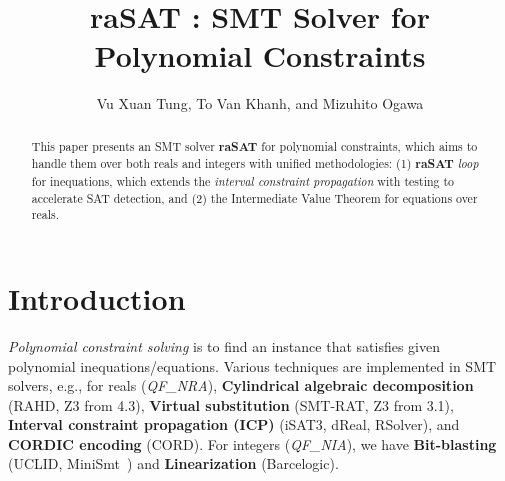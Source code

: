\documentclass[runningheads,a4paper,oribibl]{llncs}
\begin{document}
%

\title{raSAT : SMT Solver for Polynomial Constraints} 
\author{Vu Xuan Tung, To Van Khanh, and Mizuhito Ogawa} 


\maketitle

\begin{abstract}
  This paper presents an SMT solver {\bf raSAT} for polynomial constraints, 
  which aims to handle them over both reals and integers with
  unified methodologies: (1) {\bf raSAT} {\em loop} for inequations,
  which extends the \emph{interval constraint propagation}
  with testing to accelerate SAT detection, and 
  (2) the Intermediate Value Theorem for equations over reals. 
\end{abstract}


\section{Introduction}
{\em Polynomial constraint solving} is to find an instance that satisfies given
polynomial inequations/equations. Various techniques are implemented in SMT solvers,
e.g., for reals (\emph{QF\_NRA}), 
{\bf Cylindrical algebraic decomposition}
(RAHD\cite{Passmore09combineddecision}, 
  Z3 from 4.3\cite{Jovanovic13}), 
{\bf Virtual substitution} (SMT-RAT\cite{smtrat}, 
  Z3 from 3.1), 
{\bf Interval constraint propagation (ICP)}\cite{benhamou:hal-00480814}
(iSAT3\cite{isat}, dReal\cite{dRealCADE13}, RSolver\cite{rsolver}),
and 
{\bf CORDIC encoding} (CORD\cite{cordic}). 
For integers (\emph{QF\_NIA}), we have 
{\bf Bit-blasting} (UCLID\cite{Bryant07decidingbit-vector}, 
  MiniSmt~\cite{Zankl:2010:SNR:1939141.1939168}) and 
{\bf Linearization} (Barcelogic\cite{Barcelogic08}). 
\end{document}

